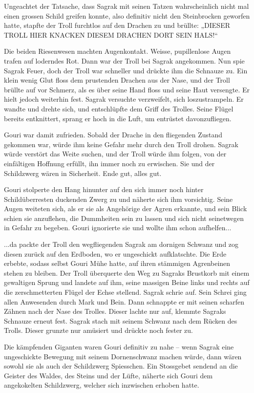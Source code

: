 Ungeachtet der Tatsache, dass Sagrak mit seinen Tatzen wahrscheinlich nicht mal einen grossen Schild greifen konnte, also definitiv nicht den Steinbrocken geworfen hatte, stapfte der Troll furchtlos auf den Drachen zu und brüllte: „DIESER TROLL HIER KNACKEN DIESEM DRACHEN DORT SEIN HALS!“

Die beiden Riesenwesen machten Augenkontakt. Weisse, pupillenlose Augen trafen auf loderndes Rot. Dann war der Troll bei Sagrak angekommen. Nun spie Sagrak Feuer, doch der Troll war schneller und drückte ihm die Schnauze zu. Ein klein wenig Glut floss dem prustenden Drachen aus der Nase, und der Troll brüllte auf vor Schmerz, als es über seine Hand floss und seine Haut versengte. Er hielt jedoch weiterhin fest. Sagrak versuchte verzweifelt, sich loszustrampeln. Er wandte und drehte sich, und entschlüpfte dem Griff des Trolles. Seine Flügel bereits entknittert, sprang er hoch in die Luft, um entrüstet davonzufliegen.

Gouri war damit zufrieden. Sobald der Drache in den fliegenden Zustand gekommen war, würde ihm keine Gefahr mehr durch den Troll drohen. Sagrak würde verstört das Weite suchen, und der Troll würde ihm folgen, von der einfältigen Hoffnung erfüllt, ihn immer noch zu erwischen. Sie und der Schildzwerg wären in Sicherheit. Ende gut, alles gut.

Gouri stolperte den Hang hinunter auf den sich immer noch hinter Schildüberresten duckenden Zwerg zu und näherte sich ihm vorsichtig. Seine Augen weiteten sich, als er sie als Angehörige der Agren erkannte, und sein Blick schien sie anzuflehen, die Dummheiten sein zu lassen und sich nicht seinetwegen in Gefahr zu begeben. Gouri ignorierte sie und wollte ihm schon aufhelfen...

...da packte der Troll den wegfliegenden Sagrak am dornigen Schwanz und zog diesen zurück auf den Erdboden, wo er ungeschickt aufklatschte. Die Erde erbebte, sodass selbst Gouri Mühe hatte, auf ihren stämmigen Agrenbeinen stehen zu bleiben. Der Troll überquerte den Weg zu Sagraks Brustkorb mit einem gewaltigen Sprung und landete auf ihm, seine massigen Beine links und rechts auf die zerschmetterten Flügel der Echse stellend. Sagrak schrie auf. Sein Schrei ging allen Anwesenden durch Mark und Bein. Dann schnappte er mit seinen scharfen Zähnen nach der Nase des Trolles. Dieser lachte nur auf, klemmte Sagraks Schnauze erneut fest. Sagrak stach mit seinem Schwanz nach dem Rücken des Trolls. Dieser grunzte nur amüsiert und drückte noch fester zu.

Die kämpfenden Giganten waren Gouri definitiv zu nahe – wenn Sagrak eine ungeschickte Bewegung mit seinem Dornenschwanz machen würde, dann wären sowohl sie als auch der Schildzwerg Spiesschen. Ein Stossgebet sendend an die Geister des Waldes, des Steins und der Lüfte, näherte sich Gouri dem angekokelten Schildzwerg, welcher sich inzwischen erhoben hatte.

